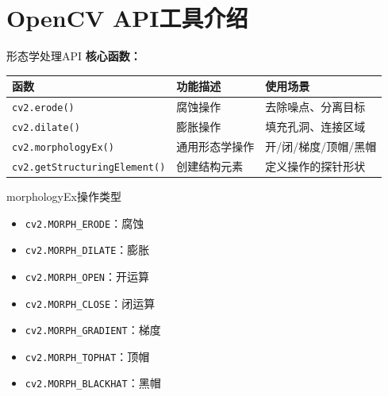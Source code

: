 \section{OpenCV API工具介绍}

\begin{frame}{形态学处理API}
    \textbf{核心函数：}

    \begin{table}
        \centering
        \small
        \begin{tabular}{lp{5cm}l}
        \toprule
        函数 & 功能描述 & 使用场景 \\
        \midrule
        \texttt{cv2.erode()} & 腐蚀操作 & 去除噪点、分离目标 \\
        \texttt{cv2.dilate()} & 膨胀操作 & 填充孔洞、连接区域 \\
        \texttt{cv2.morphologyEx()} & 通用形态学操作 & 开/闭/梯度/顶帽/黑帽 \\
        \texttt{cv2.getStructuringElement()} & 创建结构元素 & 定义操作的探针形状 \\
        \bottomrule
        \end{tabular}
    \end{table}

    \vspace{0.3cm}

    \begin{block}{morphologyEx操作类型}
    \begin{itemize}
        \item \texttt{cv2.MORPH\_ERODE}：腐蚀
        \item \texttt{cv2.MORPH\_DILATE}：膨胀
        \item \texttt{cv2.MORPH\_OPEN}：开运算
        \item \texttt{cv2.MORPH\_CLOSE}：闭运算
        \item \texttt{cv2.MORPH\_GRADIENT}：梯度
        \item \texttt{cv2.MORPH\_TOPHAT}：顶帽
        \item \texttt{cv2.MORPH\_BLACKHAT}：黑帽
    \end{itemize}
    \end{block}
\end{frame}

